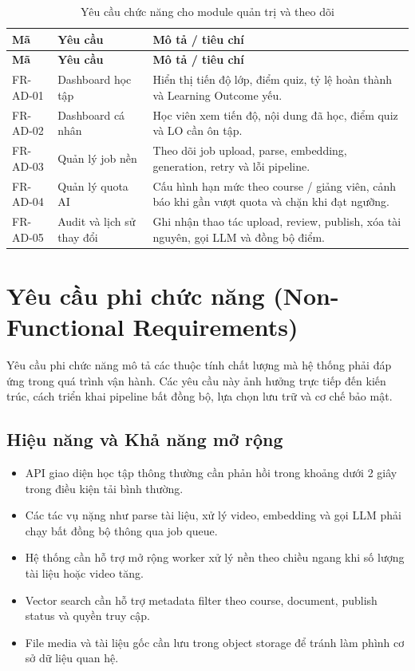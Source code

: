 \begin{longtable}{|p{2.4cm}|p{5.1cm}|p{6.9cm}|}
\caption{Yêu cầu chức năng cho module quản trị và theo dõi}
\label{tab:fr-quan-tri-theo-doi}\\
\hline
\textbf{Mã} & \textbf{Yêu cầu} & \textbf{Mô tả / tiêu chí} \\
\hline
\endfirsthead
\hline
\textbf{Mã} & \textbf{Yêu cầu} & \textbf{Mô tả / tiêu chí} \\
\hline
\endhead
FR-AD-01 & Dashboard học tập & Hiển thị tiến độ lớp, điểm quiz, tỷ lệ hoàn thành và Learning Outcome yếu. \\
\hline
FR-AD-02 & Dashboard cá nhân & Học viên xem tiến độ, nội dung đã học, điểm quiz và LO cần ôn tập. \\
\hline
FR-AD-03 & Quản lý job nền & Theo dõi job upload, parse, embedding, generation, retry và lỗi pipeline. \\
\hline
FR-AD-04 & Quản lý quota AI & Cấu hình hạn mức theo course / giảng viên, cảnh báo khi gần vượt quota và chặn khi đạt ngưỡng. \\
\hline
FR-AD-05 & Audit và lịch sử thay đổi & Ghi nhận thao tác upload, review, publish, xóa tài nguyên, gọi LLM và đồng bộ điểm. \\
\hline
\end{longtable}

\section{Yêu cầu phi chức năng (Non-Functional Requirements)}
\label{sec:yeu-cau-phi-chuc-nang}

Yêu cầu phi chức năng mô tả các thuộc tính chất lượng mà hệ thống phải đáp ứng
trong quá trình vận hành. Các yêu cầu này ảnh hưởng trực tiếp đến kiến trúc,
cách triển khai pipeline bất đồng bộ, lựa chọn lưu trữ và cơ chế bảo mật.

\subsection{Hiệu năng và Khả năng mở rộng}
\label{subsec:hieu-nang-kha-nang-mo-rong}

\begin{itemize}
    \item API giao diện học tập thông thường cần phản hồi trong khoảng dưới
          2 giây trong điều kiện tải bình thường.
    \item Các tác vụ nặng như parse tài liệu, xử lý video, embedding và gọi
          LLM phải chạy bất đồng bộ thông qua job queue.
    \item Hệ thống cần hỗ trợ mở rộng worker xử lý nền theo chiều ngang khi số
          lượng tài liệu hoặc video tăng.
    \item Vector search cần hỗ trợ metadata filter theo course, document,
          publish status và quyền truy cập.
    \item File media và tài liệu gốc cần lưu trong object storage để tránh làm
          phình cơ sở dữ liệu quan hệ.
\end{itemize}

